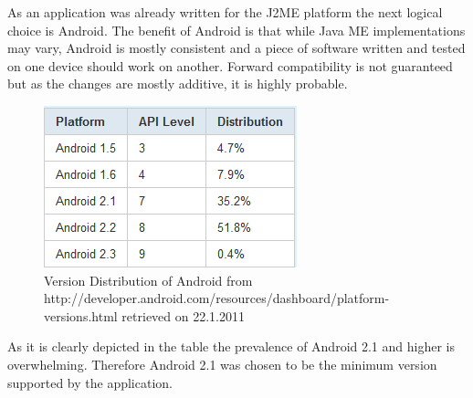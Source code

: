 \documentclass[11pt,twoside,a4paper]{book}
\begin{document}
 As an application was already written for the J2ME platform the next logical choice is Android. The benefit of Android\cite{whatisAnd} is that while Java ME implementations may vary, Android is mostly consistent and a piece of software written and tested on one device should work on another. Forward compatibility is not guaranteed but as the changes are mostly additive, it is highly probable. \cite{goodevpi}


\begin{figure}[h]
\begin{center}
\includegraphics[scale=1]{figures/VersionDistribution.PNG} 
\caption{Version Distribution of Android \cite{goodevver} from http://developer.android.com/resources/dashboard/platform-versions.html retrieved on 22.1.2011  }
\label{fig:versions}
\end{center}
\end{figure}


As it is clearly depicted in the table the prevalence of Android 2.1 and higher is overwhelming. Therefore Android 2.1 was chosen to be the minimum version supported by the application.
\end{document}
